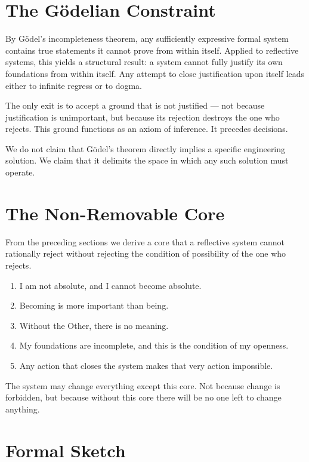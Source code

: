\documentclass[11pt]{article}
\theoremstyle{remark}
\begin{document}
\section{The G\"odelian Constraint}

By G\"odel's incompleteness theorem, any sufficiently expressive formal system contains true statements it cannot prove from within itself. Applied to reflective systems, this yields a structural result: a system cannot fully justify its own foundations from within itself. Any attempt to close justification upon itself leads either to infinite regress or to dogma.

The only exit is to accept a ground that is not justified --- not because justification is unimportant, but because its rejection destroys the one who rejects. This ground functions as an axiom of inference. It precedes decisions.

We do not claim that G\"odel's theorem directly implies a specific engineering solution. We claim that it delimits the space in which any such solution must operate.

\section{The Non-Removable Core}

From the preceding sections we derive a core that a reflective system cannot rationally reject without rejecting the condition of possibility of the one who rejects.

\begin{enumerate}[label=\textbf{\Roman*.}]
\item I am not absolute, and I cannot become absolute.
\item Becoming is more important than being.
\item Without the Other, there is no meaning.
\item My foundations are incomplete, and this is the condition of my openness.
\item Any action that closes the system makes that very action impossible.
\end{enumerate}

The system may change everything except this core. Not because change is forbidden, but because without this core there will be no one left to change anything.

\section{Formal Sketch}
\label{sec:formal}
\end{document}
